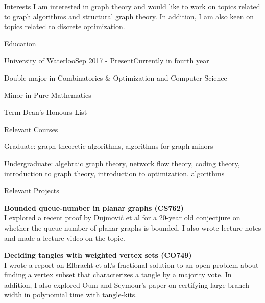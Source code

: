 \documentclass{cv}
\begin{document}
\begin{rSection}{Interests}
	I am interested in graph theory and would like to work on topics related to graph algorithms and structural graph theory. In addition, I am also keen on topics related to discrete optimization.
\end{rSection}

\begin{rSection}{Education}

\begin{rSubsection}{University of Waterloo}{Sep 2017 - Present}{Currently in fourth year}{}
	\item Double major in Combinatorics \& Optimization and Computer Science
	\item Minor in Pure Mathematics
	\item Term Dean's Honours List
\end{rSubsection}

\begin{rSubsection}{Relevant Courses}{}{}{}
	\item Graduate: graph-theoretic algorithms, algorithms for graph minors
	\item Undergraduate: algebraic graph theory, network flow theory, coding theory, introduction to graph theory, introduction to optimization, algorithms
\end{rSubsection}

\begin{rSubsection}{Relevant Projects}{}{}{}	
	\item \textbf{Bounded queue-number in planar graphs (CS762)}\\
	I explored a recent proof by Dujmovi\'{c} et al \cite{queue} for a 20-year old conjectjure on whether the queue-number of planar graphs is bounded. I also wrote lecture notes and made a lecture video on the topic.\\

	\item \textbf{Deciding tangles with weighted vertex sets (CO749)}\\
	I wrote a report on Elbracht et al.'s fractional solution \cite{tangle} to an open problem about finding a vertex subset that characterizes a tangle by a majority vote. In addition, I also explored Oum and Seymour's paper \cite{branchwidth} on certifying large branch-width in polynomial time with tangle-kits. 
\end{rSubsection}
\end{rSection}
\end{document}
